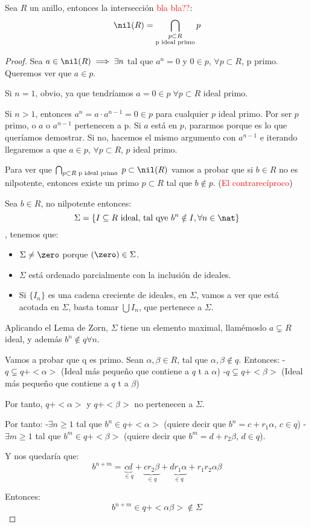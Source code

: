 \begin{prop}
	Sea $R$ un anillo, entonces la intersección \textcolor{red}{bla bla??}:
	$$ \nil(R)=\bigcap_{\substack{p\subset R\\\text{p ideal primo}}} p $$

\end{prop}
\begin{proof}

\proofpart{$\subset$}

	Sea $a \in \nil(R) \implies \exists n$ tal que $a^n=0$ y $0 \in p$, $\forall p \subset R$, p primo. Queremos ver que $a \in p$.

	Si $n=1$, obvio, ya que tendríamos $a=0\in p\; \forall p \subset R$ ideal primo.

	Si $n>1$, entonces $a^n = a\cdot a^{n-1}=0 \in p$ para cualquier $p$ ideal primo. Por ser $p$ primo, o $a$ o $a^{n-1}$ pertenecen a p. Si $a$ está en $p$, pararmos porque es lo que queríamos demostrar. Si no, hacemos el mismo argumento con $a^{n-1}$ e iterando llegaremos a que $a \in p$, $\forall p \subset R$, $p$ ideal primo.

\proofpart{$\supset$}

	Para ver que $\bigcap_{p\subset R \text{ p ideal primo }}p \subset \nil(R)$ vamos a probar que si $b \in R$ no es nilpotente, entonces existe un primo $p\subset R$ tal que $b \notin p$. (\textcolor{red}{El contrarecíproco})

	Sea $b \in R$, no nilpotente entonces:
	$$\Sigma = \{I \subseteq R \text{ ideal, tal qye }b^n \notin I, \forall n \in \nat\}$$, tenemos que:
	\begin{itemize}
	\item $\Sigma \neq \zero$ porque $(\zero) \in \Sigma$.
	\item $\Sigma$ está ordenado parcialmente con la inclusión de ideales.
	\item Si $\{I_n\}$ es una cadena creciente de ideales, en $\Sigma$, vamos a ver que está acotada en $\Sigma$, basta tomar $\bigcup I_n$, que pertenece a $\Sigma$.
	\end{itemize}

	Aplicando el Lema de Zorn, $\Sigma$ tiene un elemento maximal, llamémoslo $a \subsetneq R$ ideal, y además $b^n \notin q \forall n$.

	Vamos a probar que q es primo. Sean $\alpha, \beta \in R$, tal que $\alpha, \beta \notin q$. Entonces:
	-$q \subsetneq q + <\alpha>$ (Ideal más pequeño que contiene a $q$ t a $\alpha$)
	-$q \subsetneq q + <\beta>$ (Ideal más pequeño que contiene a $q$ t a $\beta$)

	Por tanto, $ q + <\alpha>$ y $q + <\beta>$ no pertenecen a $\Sigma$.

	Por tanto:
	-$\exists n\geq 1$ tal que $b^n \in q+<\alpha>$ (quiere decir que $b^n=c+r_1 \alpha$, $c\in q$)
	-$\exists m\geq 1$ tal que $b^m \in q+<\beta>$ (quiere decir que $b^m=d+r_2 \beta$, $d\in q$).

	Y nos quedaría que:
	$$b^{n+m}=\underbrace{cd}_{\in q}+\underbrace{cr_2\beta}_{\in q}+\underbrace{dr_1\alpha}_{\in q}+r_1r_2\alpha \beta$$

	Entonces:
	$$b^{n+m}\in q+<\alpha \beta> \notin \Sigma$$

\end{proof}

